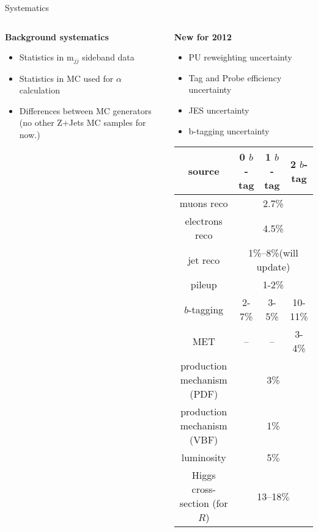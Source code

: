 \documentclass{beamer}
\begin{document}
\begin{frame}{Systematics}


\begin{columns}
    \begin{column}{0.45\textwidth}
 
{\small      
{\bf Background systematics}
\vspace{0.2em}

      \begin{itemize}
      \item Statistics in m$_{jj}$ sideband data
      \item Statistics in MC used for $\alpha$ calculation
      \item  Differences between MC generators
        (\alert{no other Z+Jets MC samples for now.}) 
      \end{itemize}
}

    \end{column}
    
    \begin{column}{0.55\textwidth}
 {\small  
{\bf New for 2012}
      \begin{itemize}
        \item PU reweighting uncertainty
        \item Tag and Probe efficiency uncertainty
        \item JES uncertainty
        \item b-tagging uncertainty 
      \end{itemize}
}
\vspace{0.5em}

      {\tiny
        \begin{tabular}{|c|c|c|c|}
          \hline
          source &   0 $b$-tag &   1 $b$-tag &   2 $b$-tag \\
          \hline
          \hline
          muons  reco &  \multicolumn{3}{|c|}{2.7\%} \\
          \hline
          electrons reco &  \multicolumn{3}{|c|}{4.5\%} \\
          \hline
          jet reco &  \multicolumn{3}{|c|}{1\%--8\%(will update)} \\
          \hline
          pileup &  \multicolumn{3}{|c|}{1-2\%}  \\
          \hline
          $b$-tagging &  2-7\% & 3-5\% & 10-11\% \\
          \hline
          MET &  -- & -- & 3-4\% \\
          \hline
          production mechanism (PDF)&  \multicolumn{3}{|c|}{3\%} \\
          \hline
          production mechanism (VBF)&   \multicolumn{3}{|c|}{1\%}  \\
          \hline
          luminosity &  \multicolumn{3}{|c|}{5$\%$} \\
          \hline
          Higgs cross-section (for $R$) &  \multicolumn{3}{|c|}{13--18$\%$ }   \\
          \hline
        \end{tabular}
      }
      

\end{column}
\end{columns}
\end{frame}
\end{document}
